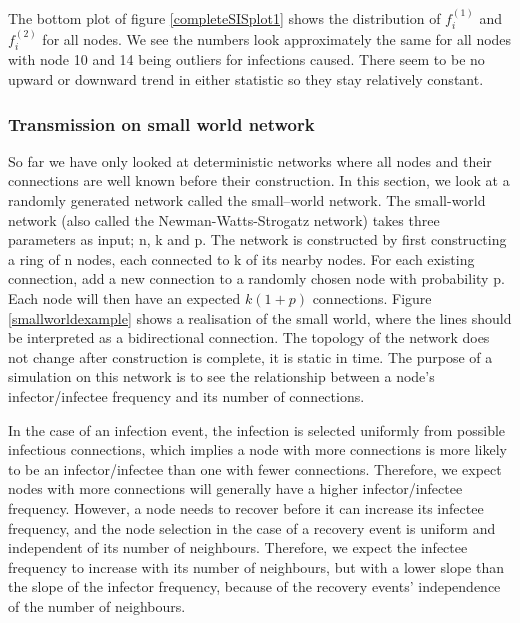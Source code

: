 \documentclass[12pt]{article} %
\numberwithin{equation}{section}
\begin{document}
The bottom plot of figure \ref{completeSISplot1} shows the distribution of $f_i^{(1)}$ and $f_i^{(2)}$ for all nodes. We see the numbers look approximately the same for all nodes with node 10 and 14 being outliers for infections caused. There seem to be no upward or downward trend in either statistic so they stay relatively constant.

\FloatBarrier
\subsubsection{Transmission on small world network}\label{smallsection}
So far we have only looked at deterministic networks where all nodes and their connections are well known before their construction. In this section, we look at a randomly generated network called the small--world network. The small-world network (also called the Newman-Watts-Strogatz network) takes three parameters as input; n, k and p. The network is constructed by first constructing a ring of n nodes, each connected to k of its nearby nodes. For each existing connection, add a new connection to a randomly chosen node with probability p. Each node will then have an expected $k(1+p)$ connections. Figure \ref{smallworldexample} shows a realisation of the small world, where the lines should be interpreted as a bidirectional connection. The topology of the network does not change after construction is complete, it is static in time. The purpose of a simulation on this network is to see the relationship between a node's infector/infectee frequency and its number of connections. 

In the case of an infection event, the infection is selected uniformly from possible infectious connections, which implies a node with more connections is more likely to be an infector/infectee than one with fewer connections. Therefore, we expect nodes with more connections will generally have a higher infector/infectee frequency. However, a node needs to recover before it can increase its infectee frequency, and the node selection in the case of a recovery event is uniform and independent of its number of neighbours. Therefore, we expect the infectee frequency to increase with its number of neighbours, but with a lower slope than the slope of the infector frequency, because of the recovery events' independence of the number of neighbours.
\end{document}
